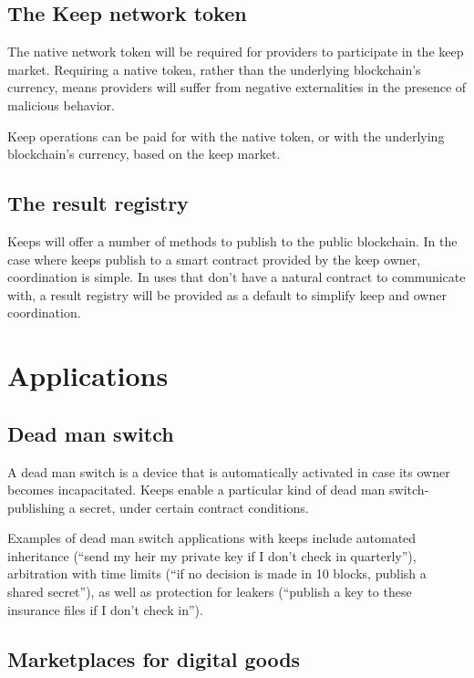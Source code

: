 \documentclass[11pt]{article}
\begin{document}
\subsection{The Keep network token}

The native network token will be required for providers to participate
in the keep market. Requiring a native token, rather than the
underlying blockchain’s currency, means providers will suffer from
negative externalities in the presence of malicious behavior.

Keep operations can be paid for with the native token, or with the
underlying blockchain’s currency, based on the keep market.

\subsection{The result registry}

Keeps will offer a number of methods to publish to the public
blockchain. In the case where keeps publish to a smart contract
provided by the keep owner, coordination is simple. In uses that don’t
have a natural contract to communicate with, a result registry will be
provided as a default to simplify keep and owner coordination.

\section{Applications}

\subsection{Dead man switch}

A dead man switch is a device that is automatically activated in case
its owner becomes incapacitated. Keeps enable a particular kind of
dead man switch- publishing a secret, under certain contract
conditions.

Examples of dead man switch applications with keeps include automated
inheritance (“send my heir my private key if I don’t check in
quarterly”), arbitration with time limits (“if no decision is made in
10 blocks, publish a shared secret”), as well as protection for
leakers (“publish a key to these insurance files if I don’t check
in”).

\subsection{Marketplaces for digital goods}
\end{document}
